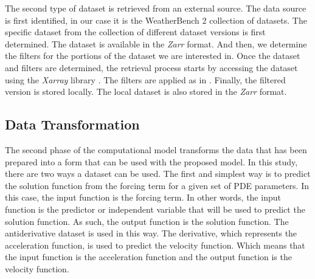 The second type of dataset is retrieved from an external source. The data source is first identified, in our case it is the WeatherBench 2 collection of datasets. The specific dataset from the collection of different dataset versions is first determined. The dataset is available in the \emph{Zarr} format. And then, we determine the filters for the portions of the dataset we are interested in. Once the dataset and filters are determined, the retrieval process starts by accessing the dataset using the \emph{Xarray} library \autocite{hoyer2017xarray,hoyerXarray2024}. The filters are applied as in . Finally, the filtered version is stored locally. The local dataset is also stored in the \emph{Zarr} format.

\subsection{Data Transformation}\label{sec:data_transformation}
\noindent The second phase of the computational model transforms the data that has been prepared into a form that can be used with the proposed model. In this study, there are two ways a dataset can be used. The first and simplest way is to predict the solution function from the forcing term for a given set of PDE parameters. In this case, the input function is the forcing term. In other words, the input function is the predictor or independent variable that will be used to predict the solution function. As such, the output function is the solution function. The antiderivative dataset is used in this way. The derivative, which represents the acceleration function, is used to predict the velocity function. Which means that the input function is the acceleration function and the output function is the velocity function.

